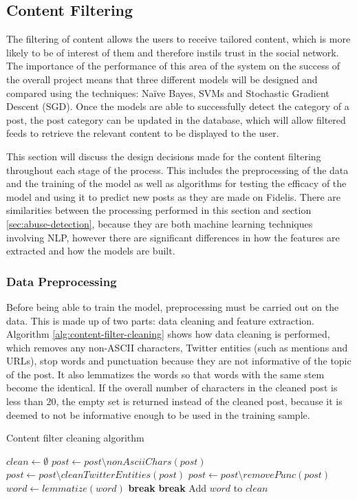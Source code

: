 \subsection{Content Filtering}
The filtering of content allows the users to receive tailored content, which is more likely to be of interest of them and therefore instils trust in the social network. The importance of the performance of this area of the system on the success of the overall project means that three different models will be designed and compared using the techniques: Na\"ive Bayes, SVMs and Stochastic Gradient Descent (SGD). Once the models are able to successfully detect the category of a post, the post category can be updated in the database, which will allow filtered feeds to retrieve the relevant content to be displayed to the user. 

This section will discuss the design decisions made for the content filtering throughout each stage of the process. This includes the preprocessing of the data and the training of the model as well as algorithms for testing the efficacy of the model and using it to predict new posts as they are made on Fidelis. There are similarities between the processing performed in this section and section \ref{sec:abuse-detection}, because they are both machine learning techniques involving NLP, however there are significant differences in how the features are extracted and how the models are built.

\subsubsection{Data Preprocessing}
Before being able to train the model, preprocessing must be carried out on the data. This is made up of two parts: data cleaning and feature extraction. Algorithm \ref{alg:content-filter-cleaning} shows how data cleaning is performed, which removes any non-ASCII characters, Twitter entities (such as mentions and URLs), stop words and punctuation because they are not informative of the topic of the post. It also lemmatizes the words so that words with the same stem become the identical. If the overall number of characters in the cleaned post is less than 20, the empty set is returned instead of the cleaned post, because it is deemed to not be informative enough to be used in the training sample.

\begin{algorithm}
\caption{Content filter cleaning algorithm}
\label{alg:content-filter-cleaning}
\begin{algorithmic}[1]
	\State $clean\gets \emptyset$
	\State $post\gets post\setminus nonAsciiChars(post)$ 
	\State $post\gets post\setminus cleanTwitterEntities(post)$
	\State $post\gets post\setminus removePunc(post)$
		\State $word\gets lemmatize(word)$
			\State \textbf{break} 
		\EndIf
			\State \textbf{break} 
		\EndIf
		\State Add $word$ to $clean$
	\EndFor
		\State \Return{$\emptyset$}
	\Else
		\State {}
	\EndIf
\EndFunction
\end{algorithmic}
\end{algorithm}

